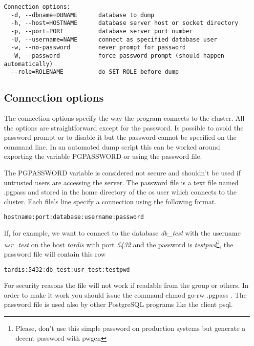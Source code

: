 \begin{verbatim}
Connection options:
  -d, --dbname=DBNAME      database to dump
  -h, --host=HOSTNAME      database server host or socket directory
  -p, --port=PORT          database server port number
  -U, --username=NAME      connect as specified database user
  -w, --no-password        never prompt for password
  -W, --password           force password prompt (should happen automatically)
  --role=ROLENAME          do SET ROLE before dump

\end{verbatim}

\subsection{Connection options}
The connection options specify the way the program connects to the cluster. All the options are 
straightforward except for the password. Is possible to avoid the password prompt or to disable it 
but the password cannot be specified on the command line. In an automated dump script this can be 
worked around exporting the variable PGPASSWORD or using the password 
file.\newline

The PGPASSWORD variable is considered not secure and shouldn't be used if untrusted users are 
accessing the server. The password file is a text file named .pgpass and stored in the home 
directory of the os user which connects to the cluster.\newline
Each file's line specify a connection using the following format.
\begin{verbatim}
hostname:port:database:username:password
\end{verbatim}

If, for example, we want to connect to the database \textit{db\_test} with the username 
\textit{usr\_test} on the host \textit{tardis} with port \textit{5432} and the password is 
\textit{testpwd}\footnote{Please, don't use this simple password on production systems but generate 
a decent password with pwgen}, the password file will contain this row

\begin{verbatim}
tardis:5432:db_test:usr_test:testpwd
\end{verbatim}

For security reasons the file will not work if readable from the group or others. In 
order to make it work you should issue the command chmod go-rw .pgpass . The password file is used 
also by other PostgreSQL programs like the client psql.\newline

